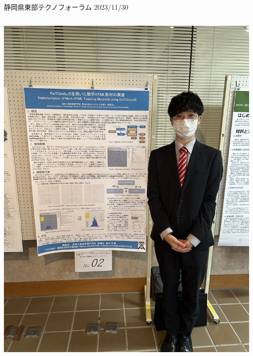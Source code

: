 \documentclass[dvipdfmx, unicode]{beamer}
\begin{document}
\begin{frame}[t]{静岡県東部テクノフォーラム 2023/11/30}
\begin{columns}[T]
\begin{column}{0.5\linewidth}
      \includegraphics[scale=0.05]{img/ActiveReport/20231015_p.png}
    \end{column}
  \end{columns}
\end{frame}
\end{document}
